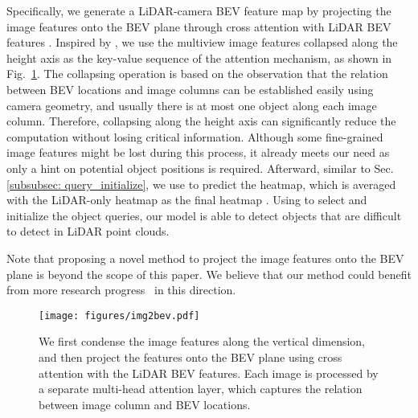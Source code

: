Specifically, we generate a LiDAR-camera BEV feature map  by projecting the image features  onto {the} BEV plane through cross attention with LiDAR BEV features .
Inspired by \cite{Roddick2020PredictingSM}, we use the multiview image features collapsed {a}long the height axis as {the key-value sequence of the attention mechanism,} 
as shown in Fig.~\ref{fig:img2bev}. The  {collapsing} operation is based on the observation that the relation between BEV locations and image columns can be established easily using camera geometry, and usually there is at most one object along each image column. Therefore, collapsing {along} the height axis {can} significantly reduce the computation without losing critical information. Although some fine-grained image features might be lost during this process, it already 
{meets} our need 
{as only a hint on potential object positions is required.} Afterward, similar {to} Sec. \ref{subsubsec: query_initialize}, we use  to predict the heatmap{, which is} averaged with the LiDAR-only heatmap  as the final heatmap . Using  to select and initialize the object queries, our model is able to detect objects that are difficult to detect in {LiDAR point clouds.}


Note that proposing a novel method to project the image features onto the BEV plane is beyond the scope of this paper{. We} believe that our method could benefit from more research progress~\cite{Roddick2019OrthographicFT, Roddick2020PredictingSM, Philion2020LiftSS} 
{in} this direction.

\begin{figure}[t]
	\vspace{-0.5cm}
	\setlength{\abovecaptionskip}{0.0cm}
	 \setlength{\belowcaptionskip}{-0.45cm}
	\center
    \texttt{[image: figures/img2bev.pdf]}
    \caption{We first condense the image features along the vertical dimension, {and} then project the features onto {the} BEV plane using cross attention with the LiDAR BEV features. Each image is process{ed} by a separate multi-head attention layer{,} which captures the relation between image column and BEV locations.}
    \label{fig:img2bev}
\end{figure}


\xy{
}







